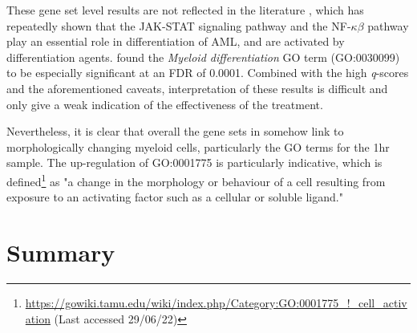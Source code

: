 These gene set level results are not reflected in the literature \citep{matikainen1997retinoic, gianni1997stat1, cohen2005jak, ren2013resveratrol, iwata2016parp9}, which has repeatedly shown that the JAK-STAT signaling pathway and the NF-$\kappa\beta$ pathway play an essential role in differentiation of \ac{AML}, and are activated by differentiation agents. \cite{gatt2021tyrosol} found the \textit{Myeloid differentiation} \ac{GO} term (\ac{GO}:0030099) to be especially significant at an \ac{FDR} of 0.0001. Combined with the high \textit{q}-scores and the aforementioned caveats, interpretation of these results is difficult and only give a weak indication of the effectiveness of the treatment. 

Nevertheless, it is clear that overall the gene sets in \cite{tab:gage} somehow link to morphologically changing myeloid cells, particularly the \ac{GO} terms for the 1hr sample. The up-regulation of GO:0001775 is particularly indicative, which is defined\footnote{\url{https://gowiki.tamu.edu/wiki/index.php/Category:GO:0001775_!_cell_activation} (Last accessed 29/06/22)} as "a change in the morphology or behaviour of a cell resulting from exposure to an activating factor such as a cellular or soluble ligand."





\section{Summary}
\enlargethispage{\baselineskip} %
